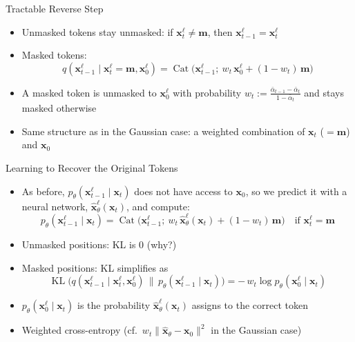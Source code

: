 \documentclass[11pt,compress,t,notes=noshow, xcolor=table]{beamer}
\providecommand{\bx}{\mathbf{x}}
\begin{document}
\begin{frame}{Tractable Reverse Step}
 
\vfill
 
\begin{itemize}
\item Unmasked tokens stay unmasked: if $\bx_t^\ell \neq \mathbf{m}$, then $\bx_{t-1}^\ell = \bx_t^\ell$
\item Masked tokens:
\begin{equation*}
q(\bx_{t-1}^\ell \mid \bx_t^\ell = \mathbf{m}, \bx_0^\ell) = \operatorname{Cat}\Big(\bx_{t-1}^\ell;\ w_t\, \bx_0^\ell + (1 - w_t)\, \mathbf{m}\Big)
\end{equation*}
\item A masked token is unmasked to $\bx_0^\ell$ with probability $w_t := \frac{\bar{\alpha}_{t-1} - \bar{\alpha}_t}{1 - \bar{\alpha}_t}$ and stays masked otherwise
\item Same structure as in the Gaussian case: a weighted combination of $\bx_t$ ($= \mathbf{m}$) and $\bx_0$
\end{itemize}
 
\vfill
 
\end{frame}



\begin{frame}{Learning to Recover the Original Tokens}
 
\vfill
 
\begin{itemize}
\item As before, $p_\theta(\bx_{t-1}^\ell \mid \bx_t)$ does not have access to $\bx_0$, so we predict it with a neural network, $\hat{\bx}_\theta^\ell(\bx_t)$, and compute:
\begin{equation*}
p_\theta(\bx_{t-1}^\ell \mid \bx_t) = \operatorname{Cat}\big(\bx_{t-1}^\ell;\ w_t\, \hat{\bx}_\theta^\ell(\bx_t) + (1 - w_t)\, \mathbf{m}\big) \quad \text{if } \bx_t^\ell = \mathbf{m}
\end{equation*}
\item Unmasked positions: KL is $0$ (why?)
\item Masked positions: KL simplifies as
\begin{equation*}
\operatorname{KL}\big(q(\bx_{t-1}^\ell \mid \bx_t^\ell, \bx_0^\ell) \,\|\, p_\theta(\bx_{t-1}^\ell \mid \bx_t)\big) = -\,w_t \log p_\theta(\bx_0^\ell \mid \bx_t)
\end{equation*}
\item $p_\theta(\bx_0^\ell \mid \bx_t)$ is the probability $\hat{\bx}_\theta^\ell(\bx_t)$ assigns to the correct token
\item Weighted cross-entropy (cf.\ $w_t \|\hat{\bx}_\theta - \bx_0\|^2$ in the Gaussian case)
\end{itemize}
 
\vfill
 
\end{frame}
\end{document}
